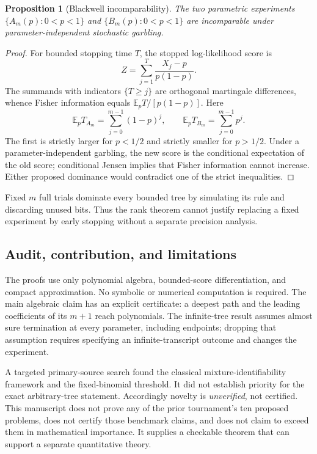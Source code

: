 \documentclass[11pt,a4paper]{article}
\newtheorem{proposition}[theorem]{Proposition}
\theoremstyle{definition}\newtheorem{definition}[theorem]{Definition}
\theoremstyle{remark}\newtheorem{remark}[theorem]{Remark}
\newcommand{\E}{\mathbb E}\newcommand{\one}{\mathbf 1}\newcommand{\1}{\mathbf 1}
\numberwithin{equation}{section}
\begin{document}
\begin{proposition}[Blackwell incomparability]
The two parametric experiments $\{A_m(p):0<p<1\}$ and $\{B_m(p):0<p<1\}$ are incomparable under parameter-independent stochastic garbling.
\end{proposition}
\begin{proof}
For bounded stopping time $T$, the stopped log-likelihood score is
\[
 Z=\sum_{j=1}^{T}\frac{X_j-p}{p(1-p)}.
\]
The summands with indicators $\{T\ge j\}$ are orthogonal martingale differences, whence Fisher information equals $\E_pT/[p(1-p)]$. Here
\[
 \E_pT_{A_m}=\sum_{j=0}^{m-1}(1-p)^j,
 \qquad \E_pT_{B_m}=\sum_{j=0}^{m-1}p^j.
\]
The first is strictly larger for $p<1/2$ and strictly smaller for $p>1/2$. Under a parameter-independent garbling, the new score is the conditional expectation of the old score; conditional Jensen implies that Fisher information cannot increase. Either proposed dominance would contradict one of the strict inequalities.
\end{proof}
Fixed $m$ full trials dominate every bounded tree by simulating its rule and discarding unused bits. Thus the rank theorem cannot justify replacing a fixed experiment by early stopping without a separate precision analysis.

\subsection{Audit, contribution, and limitations}\label{M01-sec-7}
The proofs use only polynomial algebra, bounded-score differentiation, and compact approximation. No symbolic or numerical computation is required. The main algebraic claim has an explicit certificate: a deepest path and the leading coefficients of its $m+1$ reach polynomials. The infinite-tree result assumes almost sure termination at every parameter, including endpoints; dropping that assumption requires specifying an infinite-transcript outcome and changes the experiment.

A targeted primary-source search found the classical mixture-identifiability framework and the fixed-binomial threshold. It did not establish priority for the exact arbitrary-tree statement. Accordingly novelty is \emph{unverified}, not certified. This manuscript does not prove any of the prior tournament's ten proposed problems, does not certify those benchmark claims, and does not claim to exceed them in mathematical importance. It supplies a checkable theorem that can support a separate quantitative theory.
\end{document}
